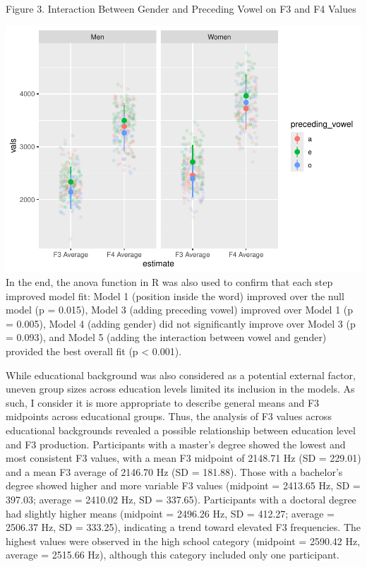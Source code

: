 \documentclass[
  man]{apa6}
\begin{document}
Figure 3.
Interaction Between Gender and Preceding Vowel on F3 and F4 Values

\includegraphics{paper_files/figure-latex/unnamed-chunk-6-1.pdf}
In the end, the anova function in R was also used to confirm that each step improved model fit: Model 1 (position inside the word) improved over the null model (p = 0.015), Model 3 (adding preceding vowel) improved over Model 1 (p = 0.005), Model 4 (adding gender) did not significantly improve over Model 3 (p = 0.093), and Model 5 (adding the interaction between vowel and gender) provided the best overall fit (p \textless{} 0.001).

While educational background was also considered as a potential external factor, uneven group sizes across education levels limited its inclusion in the models. As such, I consider it is more appropriate to describe general means and F3 midpoints across educational groups. Thus, the analysis of F3 values across educational backgrounds revealed a possible relationship between education level and F3 production. Participants with a master's degree showed the lowest and most consistent F3 values, with a mean F3 midpoint of 2148.71 Hz (SD = 229.01) and a mean F3 average of 2146.70 Hz (SD = 181.88). Those with a bachelor's degree showed higher and more variable F3 values (midpoint = 2413.65 Hz, SD = 397.03; average = 2410.02 Hz, SD = 337.65). Participants with a doctoral degree had slightly higher means (midpoint = 2496.26 Hz, SD = 412.27; average = 2506.37 Hz, SD = 333.25), indicating a trend toward elevated F3 frequencies. The highest values were observed in the high school category (midpoint = 2590.42 Hz, average = 2515.66 Hz), although this category included only one participant.
\end{document}
